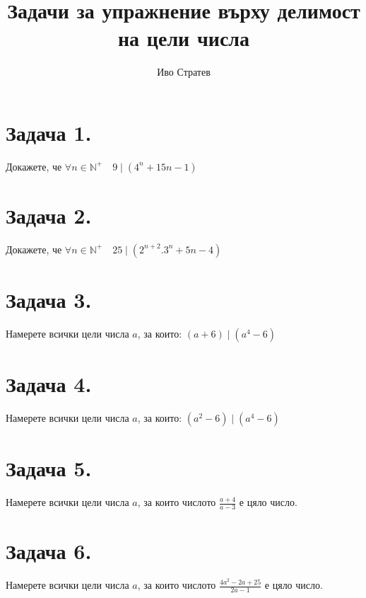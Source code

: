 \documentclass[12pt]{article}
\title{Задачи за упражнение върху делимост на цели числа}
\author{Иво Стратев}
\newcommand{\N}{\mathbb{N}}
\begin{document}
\maketitle
    
\section*{Задача 1.}
Докажете, че $\forall n \in \N^+ \quad 9 \mid (4^n + 15n - 1)$

\section*{Задача 2.}
Докажете, че $\forall n \in \N^+ \quad 25 \mid (2^{n + 2}.3^n + 5n - 4)$

\section*{Задача 3.}
Намерете всички цели числа $a$, за които: $(a + 6) \mid (a^4 - 6)$

\section*{Задача 4.}
Намерете всички цели числа $a$, за които: $(a^2 - 6) \mid (a^4 - 6)$

\section*{Задача 5.}
Намерете всички цели числа $a$, за които числото $\displaystyle\frac{a + 4}{a - 3}$ е цяло число.

\section*{Задача 6.}
Намерете всички цели числа $a$, за които числото $\displaystyle\frac{4a^2 -2a + 25}{2a - 1}$ е цяло число.
\end{document}

